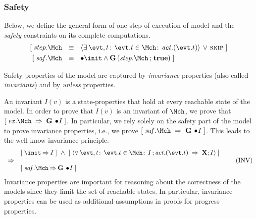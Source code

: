 \subsubsection{Safety} Below, we define the general form of one step
of execution of model \Mch and the \emph{safety} constraints on its
complete computations.
\begin{align}
  \ew{\step.\Mch  \Wide{&\eqv} \qexists{\evt, t}{\evt.t \in \Mch}{\action.(\evt.t)} \,\lor\, \SKIP} \label{eq:step} \\
  \ew{\safety.\Mch  \Wide{&\eqv}  \initially \init \land
    \G(\step.\Mch \, ; \,\ctrue)}
\end{align}
% 

Safety properties of the model are captured by \emph{invariance} properties
(also called \emph{invariants}) and by \emph{unless} properties. 

An invariant $I(v)$ is a state-properties that hold at every reachable state of the model.
In order to prove that $I(v)$ is an invariant of $\Mch$,
we prove that $\ew{\execution.\Mch \wide{\limp} \G \initially \! I}$.
In particular, we rely solely on the safety part of the model to prove
invariance properties, i.e., we prove $\ew{\safety.\Mch \wide{\limp} \G
  \initially \! I}$.  This leads to the well-know invariance principle.
\begin{equation}
  \begin{array}{ll}
    & \ew{\init \limp I} \wide{\land} 
    \ew{\qforall{\evt, t}{\evt.t \in \Mch}{I \, ;  \action.(\evt.t) ~\limp~ \X;I}} \\
    \implies &\\
    & \ew{\safety.\Mch \limp \G \initially \! I}
  \end{array}
  \tag{INV}
\end{equation}
Invariance properties are important for reasoning about the correctness
of the models since they limit the set of reachable states.  In
particular, invariance properties can be used as additional
assumptions in proofs for progress properties.

